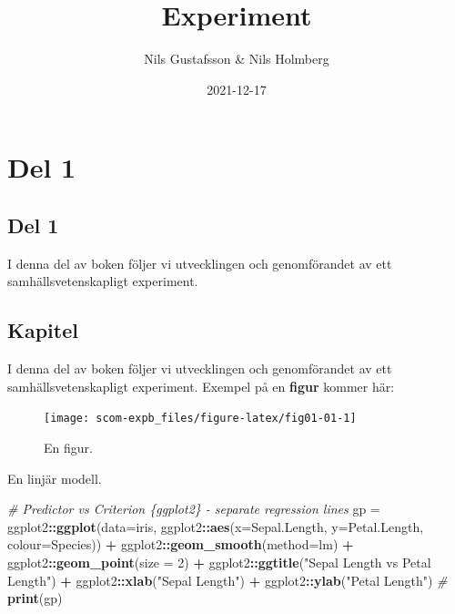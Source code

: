 \documentclass[
]{book}
\title{Experiment}
\author{Nils Gustafsson \& Nils Holmberg}
\date{2021-12-17}
\newenvironment{Shaded}{\begin{snugshade}}{\end{snugshade}}
\newcommand{\CommentTok}[1]{\textcolor[rgb]{0.56,0.35,0.01}{\textit{#1}}}
\newcommand{\DataTypeTok}[1]{\textcolor[rgb]{0.13,0.29,0.53}{#1}}
\newcommand{\DecValTok}[1]{\textcolor[rgb]{0.00,0.00,0.81}{#1}}
\newcommand{\KeywordTok}[1]{\textcolor[rgb]{0.13,0.29,0.53}{\textbf{#1}}}
\newcommand{\NormalTok}[1]{#1}
\newcommand{\OperatorTok}[1]{\textcolor[rgb]{0.81,0.36,0.00}{\textbf{#1}}}
\newcommand{\StringTok}[1]{\textcolor[rgb]{0.31,0.60,0.02}{#1}}
\begin{document}
\maketitle

{
\setcounter{tocdepth}{1}
\tableofcontents
}
\hypertarget{part-del-1}{%
\part{Del 1}\label{part-del-1}}

\hypertarget{del-1}{%
\chapter*{Del 1}\label{del-1}}

I denna del av boken följer vi utvecklingen och genomförandet av ett samhällsvetenskapligt experiment.

\hypertarget{chap01}{%
\chapter{Kapitel}\label{chap01}}

I denna del av boken följer vi utvecklingen och genomförandet av ett samhällsvetenskapligt experiment. Exempel på en \textbf{figur} kommer här:

\begin{figure}

{\centering \texttt{[image: scom-expb\_files/figure-latex/fig01-01-1]} 

}

\caption{En figur.}\label{fig:fig01-01}
\end{figure}

En linjär modell.

\begin{Shaded}
\begin{Highlighting}[]
\CommentTok{\# Predictor vs Criterion \{ggplot2\} {-} separate regression lines}
\NormalTok{gp =}\StringTok{ }\NormalTok{ggplot2}\OperatorTok{::}\KeywordTok{ggplot}\NormalTok{(}\DataTypeTok{data=}\NormalTok{iris, }
\NormalTok{ggplot2}\OperatorTok{::}\KeywordTok{aes}\NormalTok{(}\DataTypeTok{x=}\NormalTok{Sepal.Length,}
\DataTypeTok{y=}\NormalTok{Petal.Length,}
\DataTypeTok{colour=}\NormalTok{Species)) }\OperatorTok{+}\StringTok{ }
\NormalTok{ggplot2}\OperatorTok{::}\KeywordTok{geom\_smooth}\NormalTok{(}\DataTypeTok{method=}\NormalTok{lm) }\OperatorTok{+}\StringTok{ }
\NormalTok{ggplot2}\OperatorTok{::}\KeywordTok{geom\_point}\NormalTok{(}\DataTypeTok{size =} \DecValTok{2}\NormalTok{) }\OperatorTok{+}
\NormalTok{ggplot2}\OperatorTok{::}\KeywordTok{ggtitle}\NormalTok{(}\StringTok{"Sepal Length vs Petal Length"}\NormalTok{) }\OperatorTok{+}
\NormalTok{ggplot2}\OperatorTok{::}\KeywordTok{xlab}\NormalTok{(}\StringTok{"Sepal Length"}\NormalTok{) }\OperatorTok{+}\StringTok{ }\NormalTok{ggplot2}\OperatorTok{::}\KeywordTok{ylab}\NormalTok{(}\StringTok{"Petal Length"}\NormalTok{)}
\CommentTok{\#}
\KeywordTok{print}\NormalTok{(gp)}
\end{Highlighting}
\end{Shaded}
\end{document}
